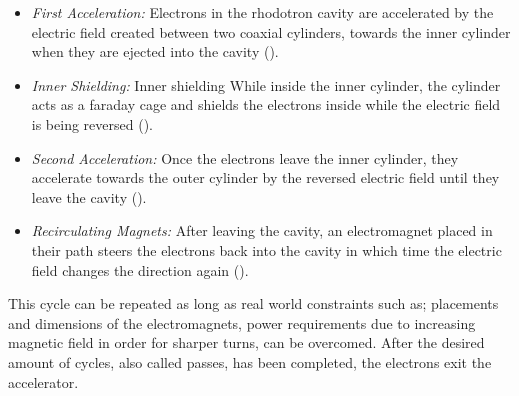 \documentclass{article}
\begin{document}

\begin{itemize}
    \item \textit{First Acceleration:} Electrons in the rhodotron cavity are accelerated by the electric field created between two coaxial cylinders, towards the inner cylinder when they are ejected into the cavity ().
    \item \textit{Inner Shielding:} Inner shielding While inside the inner cylinder, the cylinder acts as a faraday cage and shields the electrons inside while the electric field is being reversed (). 
    \item \textit{Second Acceleration:} Once the electrons leave the inner cylinder, they accelerate towards the outer cylinder by the reversed electric field until they leave the cavity (). 
    \item \textit{Recirculating Magnets:} After leaving the cavity, an electromagnet placed in their path steers the electrons back into the cavity in which time the electric field changes the direction again (). 
\end{itemize}

This cycle can be repeated as long as real world constraints such as; placements and dimensions of the electromagnets, power requirements due to increasing magnetic field in order for sharper turns, can be overcomed.
After the desired amount of cycles, also called passes, has been completed, the electrons exit the accelerator.
\end{document}
